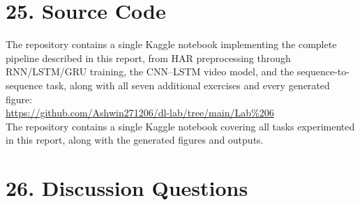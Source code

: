 \documentclass[10pt]{article}
\begin{document}

\section*{25. Source Code}

The repository contains a single Kaggle notebook implementing the complete pipeline described in this report, from HAR preprocessing through RNN/LSTM/GRU training, the CNN--LSTM video model, and the sequence-to-sequence task, along with all seven additional exercises and every generated figure:\\

    \hspace{25mm}  \url{https://github.com/Ashwin271206/dl-lab/tree/main/Lab%206}\\

The repository contains a single Kaggle notebook covering all tasks experimented in this report, along with the generated figures and outputs.


\section*{26. Discussion Questions}
\end{document}
